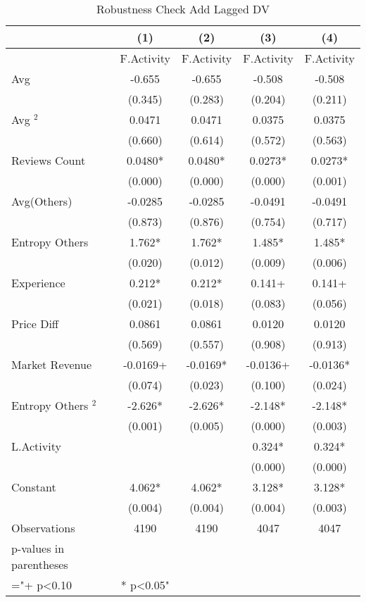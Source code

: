 \begin{table}
\centering
\begin{tabular}{@{}lcccc@{}}
\toprule
 & (1) & (2) & (3) & (4) \\ \midrule
 & F.Activity & F.Activity & F.Activity & F.Activity \\
Avg & -0.655 & -0.655 & -0.508 & -0.508 \\
 & (0.345) & (0.283) & (0.204) & (0.211) \\
Avg $^2$ & 0.0471 & 0.0471 & 0.0375 & 0.0375 \\
 & (0.660) & (0.614) & (0.572) & (0.563) \\
Reviews Count & 0.0480* & 0.0480* & 0.0273* & 0.0273* \\
 & (0.000) & (0.000) & (0.000) & (0.001) \\
Avg(Others) & -0.0285 & -0.0285 & -0.0491 & -0.0491 \\
 & (0.873) & (0.876) & (0.754) & (0.717) \\
Entropy Others & 1.762* & 1.762* & 1.485* & 1.485* \\
 & (0.020) & (0.012) & (0.009) & (0.006) \\
Experience & 0.212* & 0.212* & 0.141+ & 0.141+ \\
 & (0.021) & (0.018) & (0.083) & (0.056) \\
Price Diff & 0.0861 & 0.0861 & 0.0120 & 0.0120 \\
 & (0.569) & (0.557) & (0.908) & (0.913) \\
Market Revenue & -0.0169+ & -0.0169* & -0.0136+ & -0.0136* \\
 & (0.074) & (0.023) & (0.100) & (0.024) \\
Entropy Others  $^2$ & -2.626* & -2.626* & -2.148* & -2.148* \\
 & (0.001) & (0.005) & (0.000) & (0.003) \\
L.Activity &  &  & 0.324* & 0.324* \\
 &  &  & (0.000) & (0.000) \\
Constant & 4.062* & 4.062* & 3.128* & 3.128* \\
 & (0.004) & (0.004) & (0.004) & (0.003) \\
Observations & 4190 & 4190 & 4047 & 4047 \\
p-values in parentheses &  &  &  &  \\
="+ p\textless{}0.10 & * p\textless{}0.05" &  &  &  \\ \bottomrule
\end{tabular}
\caption{Robustness Check Add Lagged DV}
\label{rob_addlag}
\end{table}